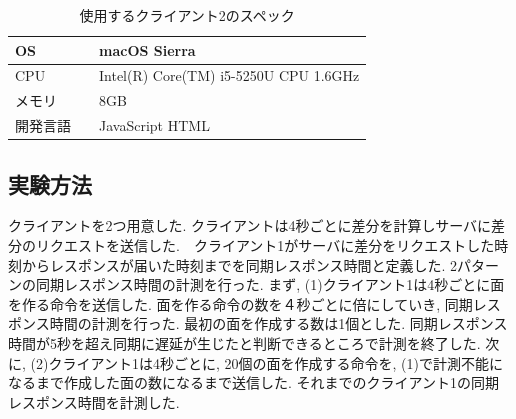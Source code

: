 \begin{table}[]
\begin{center}
	\caption{使用するクライアント2のスペック}
	\begin{tabular}{|l|l|} \hline
		OS & macOS Sierra \\ \hline
		CPU & Intel(R) Core(TM) i5-5250U CPU 1.6GHz \\ \hline
		メモリ & 8GB \\ \hline
    開発言語　& JavaScript HTML \\ \hline
	\end{tabular}
	\label{client2}
\end{center}
\end{table}

\subsection{実験方法}
クライアントを2つ用意した. クライアントは4秒ごとに差分を計算しサーバに差分のリクエストを送信した.　クライアント1がサーバに差分をリクエストした時刻からレスポンスが届いた時刻までを同期レスポンス時間と定義した. 2パターンの同期レスポンス時間の計測を行った.
まず, (1)クライアント1は4秒ごとに面を作る命令を送信した. 面を作る命令の数を４秒ごとに倍にしていき, 同期レスポンス時間の計測を行った. 最初の面を作成する数は1個とした. 同期レスポンス時間が5秒を超え同期に遅延が生じたと判断できるところで計測を終了した.
次に, (2)クライアント1は4秒ごとに, 20個の面を作成する命令を, (1)で計測不能になるまで作成した面の数になるまで送信した. それまでのクライアント1の同期レスポンス時間を計測した.

